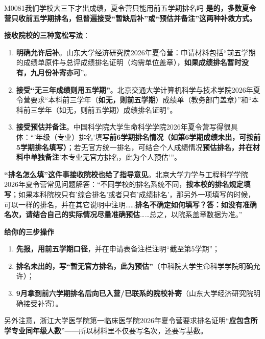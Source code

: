 \begin{qa}{M0081}{我们学校大三下才出成绩，夏令营只能用前五学期排名吗}
\textbf{是的，多数夏令营只收前五学期排名，但普遍接受“暂缺后补”或“预估并备注”这两种补救方式。}

\textbf{接收院校的三种宽松写法}：

\begin{enumerate}
  \item \textbf{明确允许后补}。山东大学经济研究院2026年夏令营：申请材料包括“前五学期的成绩单原件与总评成绩排名证明（均需单位盖章），\textbf{如果成绩排名暂时没有，九月份补寄亦可}”。
  \item \textbf{接受“无三年成绩则用五学期”}。北京交通大学计算机科学与技术学院2026年夏令营要求“本科前三学年（\textbf{如无，则前五学期}）成绩单（教务部门盖章）”和“本科前三学年（如无，则前五学期）成绩排名证明”。
  \item \textbf{接受预估并备注}。中国科学院大学生命科学学院2026年夏令营写得很具体：“'年级（专业）排名'填写\textbf{前6学期排名情况（如第6学期成绩未出，可按前5学期排名填写）}；若无官方统一排名，可结合个人成绩情况\textbf{预估排名，并在材料中单独备注}'本专业无官方排名，此为个人预估'”。
\end{enumerate}

\textbf{“排名怎么填”这件事接收院校也给了指导意见}。北京大学力学与工程科学学院2026年夏令营常见问题解答：“不同学校的排名系统不同，\textbf{按本校的排名规定填写}；如果本科院校只有'综合排名'或者只有'成绩排名'，那另外一项填写的时候，可以一样的排名，并在其它说明中注明……\textbf{排名不确定如何填写？答：如没有准确名次，请结合自己的实际情况尽量准确预估}……总之，以院系盖章数据为准。”

\textbf{给你的三步操作}
\begin{enumerate}
  \item \textbf{先报，用前五学期口径}，并在申请表备注栏注明“截至第5学期”；
  \item \textbf{排名未出的，写“暂无官方排名，此为预估”}（中科院大学生命科学学院明确允许）；
  \item \textbf{9月拿到前六学期排名后向已入营/已联系的院校补寄}（山东大学经济研究院明确接受补寄）。
\end{enumerate}

另外注意，浙江大学医学院第一临床医学院2026年夏令营要求排名证明“\textbf{应包含所学专业同年级人数}”——所以材料里不仅要写名次，还要写基数。
\end{qa}

